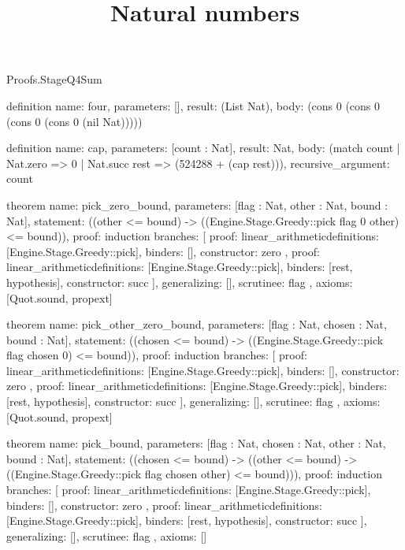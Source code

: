 \begin{lexlean}{Proofs.StageQ4Sum}
\title{Natural numbers}
\begin{semanticmodule}
definition{
  name: four,
  parameters: [],
  result: (List Nat),
  body: (cons 0 (cons 0 (cons 0 (cons 0 (nil Nat)))))
}

definition{
  name: cap,
  parameters: [count : Nat],
  result: Nat,
  body: (match count | Nat.zero => 0 | Nat.succ rest => (524288 + (cap rest))),
  recursive_argument: count
}

theorem{
  name: pick_zero_bound,
  parameters: [flag : Nat, other : Nat, bound : Nat],
  statement: ((other <= bound) -> ((Engine.Stage.Greedy::pick flag 0 other) <= bound)),
  proof: induction{
    branches: [
      {
        proof: linear_arithmetic{definitions: [Engine.Stage.Greedy::pick]},
        binders: [],
        constructor: zero
      },
      {
        proof: linear_arithmetic{definitions: [Engine.Stage.Greedy::pick]},
        binders: [rest, hypothesis],
        constructor: succ
      }
    ],
    generalizing: [],
    scrutinee: flag
  },
  axioms: [Quot.sound, propext]
}

theorem{
  name: pick_other_zero_bound,
  parameters: [flag : Nat, chosen : Nat, bound : Nat],
  statement: ((chosen <= bound) -> ((Engine.Stage.Greedy::pick flag chosen 0) <= bound)),
  proof: induction{
    branches: [
      {
        proof: linear_arithmetic{definitions: [Engine.Stage.Greedy::pick]},
        binders: [],
        constructor: zero
      },
      {
        proof: linear_arithmetic{definitions: [Engine.Stage.Greedy::pick]},
        binders: [rest, hypothesis],
        constructor: succ
      }
    ],
    generalizing: [],
    scrutinee: flag
  },
  axioms: [Quot.sound, propext]
}

theorem{
  name: pick_bound,
  parameters: [flag : Nat, chosen : Nat, other : Nat, bound : Nat],
  statement: ((chosen <= bound) -> ((other <= bound) -> ((Engine.Stage.Greedy::pick flag chosen other) <= bound))),
  proof: induction{
    branches: [
      {
        proof: linear_arithmetic{definitions: [Engine.Stage.Greedy::pick]},
        binders: [],
        constructor: zero
      },
      {
        proof: linear_arithmetic{definitions: [Engine.Stage.Greedy::pick]},
        binders: [rest, hypothesis],
        constructor: succ
      }
    ],
    generalizing: [],
    scrutinee: flag
  },
  axioms: []
}


\end{semanticmodule}
\end{lexlean}
